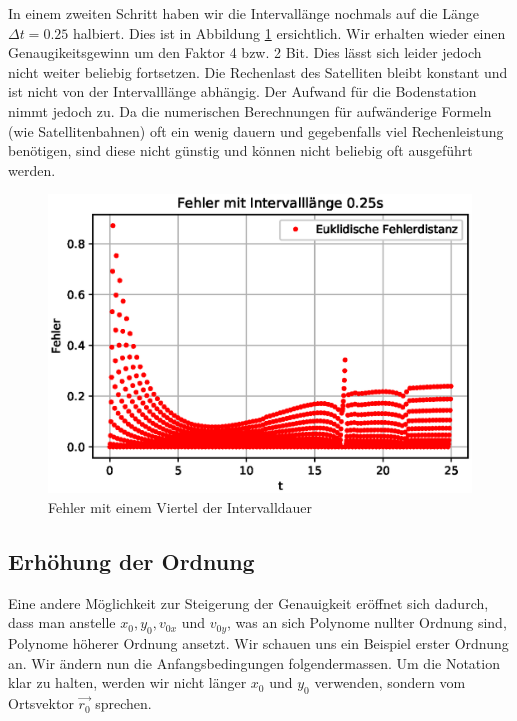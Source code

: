 In einem zweiten Schritt haben wir die Intervallänge nochmals auf die Länge $\Delta t = 0.25$ halbiert. 
Dies ist in Abbildung \ref{errorShortInterval2} ersichtlich. 
Wir erhalten wieder einen Genaugikeitsgewinn um den Faktor 4 bzw. 2 Bit. 
Dies lässt sich leider jedoch nicht weiter beliebig fortsetzen. 
Die Rechenlast des Satelliten bleibt konstant und ist nicht von der Intervalllänge abhängig. 
Der Aufwand für die Bodenstation nimmt jedoch zu. 
Da die numerischen Berechnungen für aufwänderige Formeln (wie Satellitenbahnen) oft ein wenig dauern und gegebenfalls viel Rechenleistung benötigen, sind diese nicht günstig und können nicht beliebig oft ausgeführt werden.

\begin{figure}
    \centering
    \includegraphics[scale=0.7]{papers/perturbation/bilder/perturbation_fig5.eps}
    \caption{Fehler mit einem Viertel der Intervalldauer}
	\label{errorShortInterval2}
\end{figure}

\subsection{Erhöhung der Ordnung}
Eine andere Möglichkeit zur Steigerung der Genauigkeit eröffnet sich dadurch, dass man anstelle $x_0, y_0, v_{0x}$ und $v_{0y}$, was an sich Polynome nullter Ordnung sind, Polynome höherer Ordnung ansetzt. Wir schauen uns ein Beispiel erster Ordnung an. Wir ändern nun die Anfangsbedingungen folgendermassen. Um die Notation klar zu halten, werden wir nicht länger $x_0$ und $y_0$ verwenden, sondern vom Ortsvektor $\vec{r_0}$ sprechen.

